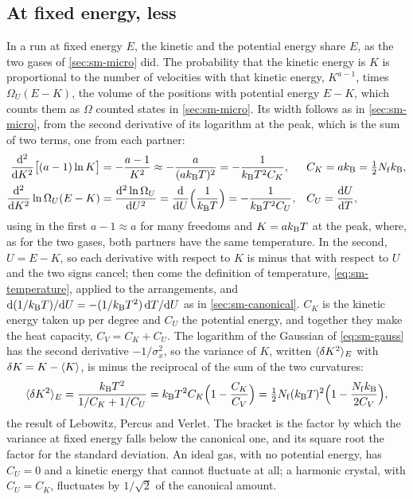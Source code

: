 \subsection*{At fixed energy, less}

In a run at fixed energy $E$, the kinetic and the potential energy share
$E$, as the two gases of \cref{sec:sm-micro} did. The probability that the
kinetic energy is $K$ is proportional to the number of velocities with
that kinetic energy, $K^{a - 1}$, times $\Omega_U(E - K)$, the volume of
the positions with potential energy $E - K$, which counts them as
$\Omega$ counted states in \cref{sec:sm-micro}. Its width follows as in
\cref{sec:sm-micro}, from the second derivative of its logarithm at the
peak, which is the sum of two terms, one from each partner:
\begin{align*}
   \frac{\mathrm{d}^2}{\mathrm{d} K^2}\bigl[(a - 1)\ln K\bigr] &= -\frac{a - 1}{K^2}
   \approx -\frac{a}{(ak_{\mathrm{B}} T)^2} = -\frac{1}{k_{\mathrm{B}} T^2C_K} ,
   && C_K = ak_{\mathrm{B}} = \tfrac12N_{\mathrm f}k_{\mathrm{B}} ,\\
   \frac{\mathrm{d}^2}{\mathrm{d} K^2}\ln\Omega_U(E - K)
   &= \frac{\mathrm{d}^2\ln\Omega_U}{\mathrm{d} U^2}
   = \frac{\mathrm{d}}{\mathrm{d} U}\Bigl(\frac{1}{k_{\mathrm{B}} T}\Bigr)
   = -\frac{1}{k_{\mathrm{B}} T^2C_U} ,
   && C_U = \frac{\mathrm{d} U}{\mathrm{d} T} ,
\end{align*}
using in the first $a - 1 \approx a$ for many freedoms and $K = ak_{\mathrm{B}} T$ at
the peak, where, as for the two gases, both partners have the same
temperature. In the second, $U = E - K$, so each derivative with respect
to $K$ is minus that with respect to $U$ and the two signs cancel; then
come the definition of temperature, \cref{eq:sm-temperature}, applied to
the arrangements, and $\mathrm{d}(1/k_{\mathrm{B}} T)/\mathrm{d} U = -(1/k_{\mathrm{B}} T^2)\,\mathrm{d} T/\mathrm{d} U$ as
in \cref{sec:sm-canonical}. $C_K$ is the kinetic energy taken up per
degree and $C_U$ the potential energy, and together they make the heat
capacity, $C_V = C_K + C_U$. The logarithm of the Gaussian of
\cref{eq:sm-gauss} has the second derivative $-1/\sigma_x^2$, so the variance of $K$, written
$\langle \delta K^2 \rangle_E$ with $\delta K = K - \langle K \rangle$, is minus the
reciprocal of the sum of the two curvatures:
\begin{equation}
   \langle \delta K^2 \rangle_E = \frac{k_{\mathrm{B}} T^2}{1/C_K + 1/C_U}
   = k_{\mathrm{B}} T^2C_K\Bigl(1 - \frac{C_K}{C_V}\Bigr)
   = \tfrac12N_{\mathrm f}(k_{\mathrm{B}} T)^2\Bigl(1 - \frac{N_{\mathrm f}k_{\mathrm{B}}}
   {2C_V}\Bigr) ,
   \label{eq:sm-lpv}
\end{equation}
the result of Lebowitz, Percus and Verlet\cite{Lebowitz1967}. The bracket
is the factor by which the variance at fixed energy falls below the
canonical one, and its square root the factor for the standard
deviation. An ideal gas, with no potential energy, has $C_U = 0$
and a kinetic energy that cannot fluctuate at all; a harmonic crystal,
with $C_U = C_K$, fluctuates by $1/\sqrt2$ of the canonical amount.

